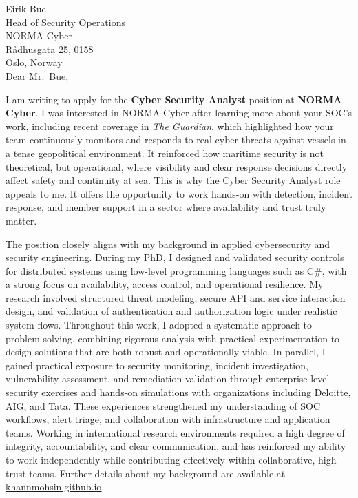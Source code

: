 Eirik Bue\\
Head of Security Operations\\
NORMA Cyber\\
Rådhusgata 25, 0158\\
Oslo, Norway\\

Dear Mr.\ Bue,

I am writing to apply for the \textbf{Cyber Security Analyst} position at \textbf{NORMA Cyber}.
%
I was interested in NORMA Cyber after learning more about your SOC’s work, including recent coverage in \textit{The Guardian}, which highlighted how your team continuously monitors and responds to real cyber threats against vessels in a tense geopolitical environment. It reinforced how maritime security is not theoretical, but operational, where visibility and clear response decisions directly affect safety and continuity at sea. This is why the Cyber Security Analyst role appeals to me. It offers the opportunity to work hands-on with detection, incident response, and member support in a sector where availability and trust truly matter.

The position closely aligns with my background in applied cybersecurity and security engineering. During my PhD, I designed and validated security controls for distributed systems using low-level programming languages such as C\#, with a strong focus on availability, access control, and operational resilience. 
My research involved structured threat modeling, secure API and service interaction design, and validation of authentication and authorization logic under realistic system flows. Throughout this work, I adopted a systematic approach to problem-solving, combining rigorous analysis with practical experimentation to design solutions that are both robust and operationally viable. In parallel, I gained practical exposure to security monitoring, incident investigation, vulnerability assessment, and remediation validation through enterprise-level security exercises and hands-on simulations with organizations including Deloitte, AIG, and Tata. These experiences strengthened my understanding of SOC workflows, alert triage, and collaboration with infrastructure and application teams. Working in international research environments required a high degree of integrity, accountability, and clear communication, and has reinforced my ability to work independently while contributing effectively within collaborative, high-trust teams. Further details about my background are available at \href{https://khannmohsin.github.io}{\underline{khannmohsin.github.io}}.

